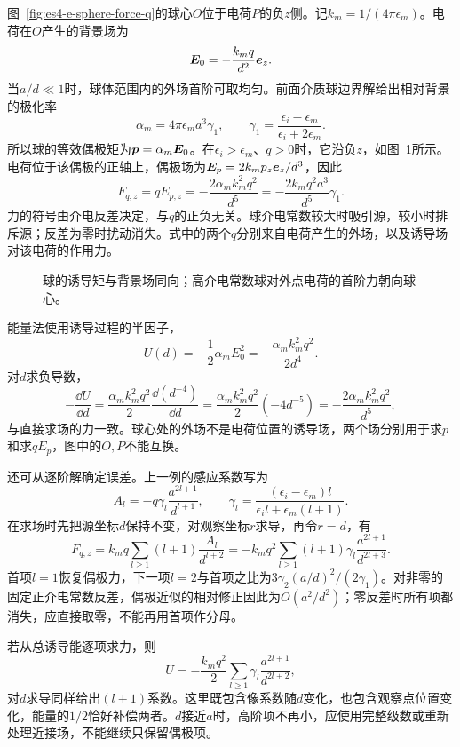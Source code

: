 \begin{solution}
图~\ref{fig:es4-e-sphere-force-q}的球心$O$位于电荷$P$的负$z$侧。记$k_m=1/(4\pi\epsilon_m)$。电荷在$O$产生的背景场为
\[\bm{E}_0=-\frac{k_mq}{d^2}\bm{e}_z.
\]
当$a/d\ll1$时，球体范围内的外场首阶可取均匀。前面介质球边界解给出相对背景的极化率
\[\alpha_m=4\pi\epsilon_ma^3\gamma_1,
\qquad \gamma_1=\frac{\epsilon_i-\epsilon_m}{\epsilon_i+2\epsilon_m}.
\]
所以球的等效偶极矩为$\bm{p}=\alpha_m\bm{E}_0$。在$\epsilon_i>\epsilon_m$、$q>0$时，它沿负$z$，如图~\ref{fig:es4-e-sphere-force-s}所示。电荷位于该偶极的正轴上，偶极场为$\bm{E}_p=2k_mp_z\bm{e}_z/d^3$，因此
\[\boxed{F_{q,z}=qE_{p,z}
=-\frac{2\alpha_mk_m^2q^2}{d^5}
=-\frac{2k_mq^2a^3}{d^5}\gamma_1}.
\]
力的符号由介电反差决定，与$q$的正负无关。球介电常数较大时吸引源，较小时排斥源；反差为零时扰动消失。式中的两个$q$分别来自电荷产生的外场，以及诱导场对该电荷的作用力。

\begin{figure}[H]\centering
{}
\caption{球的诱导矩与背景场同向；高介电常数球对外点电荷的首阶力朝向球心。}\label{fig:es4-e-sphere-force-s}
\end{figure}

能量法使用诱导过程的半因子，
\[U(d)=-\frac12\alpha_mE_0^2
=-\frac{\alpha_mk_m^2q^2}{2d^4}.
\]
对$d$求负导数，
\[-\frac{\dd U}{\dd d}=\frac{\alpha_mk_m^2q^2}{2}\frac{\dd(d^{-4})}{\dd d}
=\frac{\alpha_mk_m^2q^2}{2}(-4d^{-5})
=-\frac{2\alpha_mk_m^2q^2}{d^5},
\]
与直接求场的力一致。球心处的外场不是电荷位置的诱导场，两个场分别用于求$p$和求$qE_p$，图中的$O,P$不能互换。

还可从逐阶解确定误差。上一例的感应系数写为
\[A_l=-q\gamma_l\frac{a^{2l+1}}{d^{l+1}},\qquad
\gamma_l=\frac{(\epsilon_i-\epsilon_m)l}{\epsilon_il+\epsilon_m(l+1)}.
\]
在求场时先把源坐标$d$保持不变，对观察坐标$r$求导，再令$r=d$，有
\[F_{q,z}=k_mq\sum_{l\ge1}(l+1)\frac{A_l}{d^{l+2}}
=-k_mq^2\sum_{l\ge1}(l+1)\gamma_l\frac{a^{2l+1}}{d^{2l+3}}.
\]
首项$l=1$恢复偶极力，下一项$l=2$与首项之比为$3\gamma_2(a/d)^2/(2\gamma_1)$。对非零的固定正介电常数反差，偶极近似的相对修正因此为$O(a^2/d^2)$；零反差时所有项都消失，应直接取零，不能再用首项作分母。

若从总诱导能逐项求力，则
\[U=-\frac{k_mq^2}{2}\sum_{l\ge1}\gamma_l
\frac{a^{2l+1}}{d^{2l+2}},
\]
对$d$求导同样给出$(l+1)$系数。这里既包含像系数随$d$变化，也包含观察点位置变化，能量的$1/2$恰好补偿两者。$d$接近$a$时，高阶项不再小，应使用完整级数或重新处理近接场，不能继续只保留偶极项。

\end{solution}



